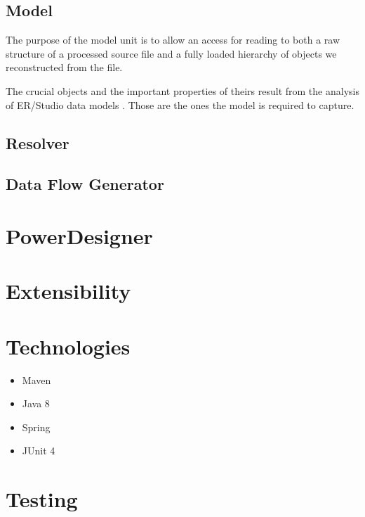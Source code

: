 
\subsection{Model}

The purpose of the model unit is to allow an access for reading to both a raw structure of a processed source file and a fully loaded hierarchy of objects we reconstructed from the file.

The crucial objects and the important properties of theirs result from the analysis of ER/Studio data models . Those are the ones the model is required to capture.

\subsection{Resolver}

\subsection{Data Flow Generator}

\section{PowerDesigner}

\section{Extensibility}



\section{Technologies}

\begin{itemize}
	\item Maven
	\item Java 8
	\item Spring
	\item JUnit 4
\end{itemize}

\section{Testing}